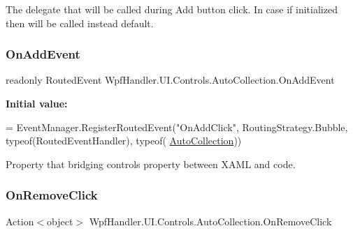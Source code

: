 The delegate that will be called during Add button click. In case if initialized then will be called instead default. 

\mbox{\label{class_wpf_handler_1_1_u_i_1_1_controls_1_1_auto_collection_adb3a377a24d9b0fefc0d58cf0c8e6289}} 
\subsubsection{\texorpdfstring{On\+Add\+Event}{OnAddEvent}}
{\footnotesize\ttfamily readonly Routed\+Event Wpf\+Handler.\+U\+I.\+Controls.\+Auto\+Collection.\+On\+Add\+Event\hspace{0.3cm}{\ttfamily [static]}}

{\bfseries Initial value\+:}
\begin{DoxyCode}
= EventManager.RegisterRoutedEvent(\textcolor{stringliteral}{"OnAddClick"},
            RoutingStrategy.Bubble, typeof(RoutedEventHandler), typeof(
      \mbox{\hyperlink{class_wpf_handler_1_1_u_i_1_1_controls_1_1_auto_collection_a8bc71a7c43dfeca1d6ff113b12088c28}{AutoCollection}}))
\end{DoxyCode}


Property that bridging control\textquotesingle{}s property between X\+A\+ML and code. 

\mbox{\label{class_wpf_handler_1_1_u_i_1_1_controls_1_1_auto_collection_a6130a353d0fadfaaf9bc17881406354f}} 
\subsubsection{\texorpdfstring{On\+Remove\+Click}{OnRemoveClick}}
{\footnotesize\ttfamily Action$<$object$>$ Wpf\+Handler.\+U\+I.\+Controls.\+Auto\+Collection.\+On\+Remove\+Click}



